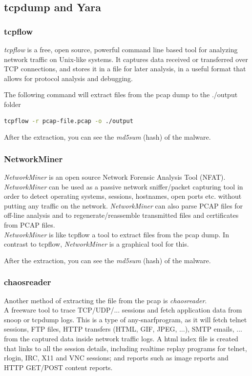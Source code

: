 \subsection{tcpdump and Yara}

\subsubsection{tcpflow}
\textit{tcpflow} is a free, open source, powerful command line based tool for analyzing network traffic on Unix-like systems. It captures data received or transferred over TCP connections, and stores it in a file for later analysis, in a useful format that allows for protocol analysis and debugging.

The following command will extract files from the pcap dump to the ./output folder
\begin{lstlisting}[language=bash]
    tcpflow -r pcap-file.pcap -o ./output
\end{lstlisting}

After the extraction, you can see the \textit{md5sum} (hash) of the malware.

\subsubsection{NetworkMiner}
\textit{NetworkMiner} is an open source Network Forensic Analysis Tool (NFAT). \textit{NetworkMiner} can be used as a passive network sniffer/packet capturing tool in order to detect operating systems, sessions, hostnames, open ports etc. without putting any traffic on the network. \textit{NetworkMiner} can also parse PCAP files for off-line analysis and to regenerate/reassemble transmitted files and certificates from PCAP files.\\

\textit{NetworkMiner} is like tcpflow a tool to extract files from the pcap dump.
In contrast to tcpflow, \textit{NetworkMiner} is a graphical tool for this.

After the extraction, you can see the \textit{md5sum} (hash) of the malware.

\subsubsection{chaosreader}
Another method of extracting the file from the pcap is \textit{chaosreader}.\\

A freeware tool to trace TCP/UDP/... sessions and fetch application data from snoop or tcpdump logs. This is a type of \glqq any-snarf\grqq program, as it will fetch telnet sessions, FTP files, HTTP transfers (HTML, GIF, JPEG, ...), SMTP emails, ... from the captured data inside network traffic logs. A html index file is created that links to all the session details, including realtime replay programs for telnet, rlogin, IRC, X11 and VNC sessions; and reports such as image reports and HTTP GET/POST content reports.

